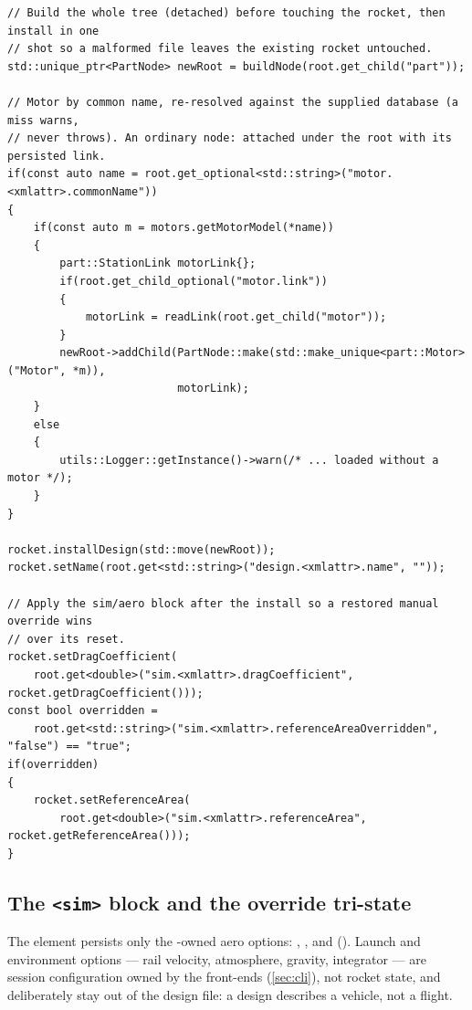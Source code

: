 \begin{listing}[htbp]
\begin{verbatim}
// Build the whole tree (detached) before touching the rocket, then install in one
// shot so a malformed file leaves the existing rocket untouched.
std::unique_ptr<PartNode> newRoot = buildNode(root.get_child("part"));

// Motor by common name, re-resolved against the supplied database (a miss warns,
// never throws). An ordinary node: attached under the root with its persisted link.
if(const auto name = root.get_optional<std::string>("motor.<xmlattr>.commonName"))
{
    if(const auto m = motors.getMotorModel(*name))
    {
        part::StationLink motorLink{};
        if(root.get_child_optional("motor.link"))
        {
            motorLink = readLink(root.get_child("motor"));
        }
        newRoot->addChild(PartNode::make(std::make_unique<part::Motor>("Motor", *m)),
                          motorLink);
    }
    else
    {
        utils::Logger::getInstance()->warn(/* ... loaded without a motor */);
    }
}

rocket.installDesign(std::move(newRoot));
rocket.setName(root.get<std::string>("design.<xmlattr>.name", ""));

// Apply the sim/aero block after the install so a restored manual override wins
// over its reset.
rocket.setDragCoefficient(
    root.get<double>("sim.<xmlattr>.dragCoefficient", rocket.getDragCoefficient()));
const bool overridden =
    root.get<std::string>("sim.<xmlattr>.referenceAreaOverridden", "false") == "true";
if(overridden)
{
    rocket.setReferenceArea(
        root.get<double>("sim.<xmlattr>.referenceArea", rocket.getReferenceArea()));
}
\end{verbatim}
\caption{The tail of 
(, lightly elided): detached motor attach,
the single atomic install, then name and sim attributes.}
\label{lst:serialization-loadtail}
\end{listing}

\subsection[The <sim> block and the override tri-state]{The \texttt{<sim>} block and the override tri-state}
\label{sec:serialization-sim}

The  element persists only the -owned aero options:
, , and 
(). Launch and environment options ---
rail velocity, atmosphere, gravity, integrator --- are session configuration owned by the
front-ends (\cref{sec:cli}), not rocket state, and deliberately stay out of the design
file: a design describes a vehicle, not a flight.

